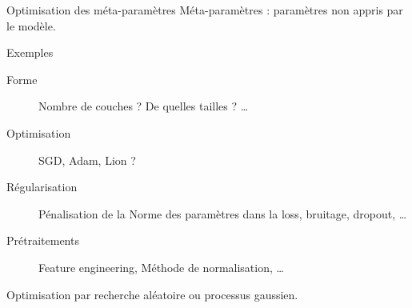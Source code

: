 \begin{frame}{Optimisation des méta-paramètres}
  Méta-paramètres : paramètres \alert{non appris} par le modèle.
  \begin{exampleblock}{Exemples}
    \begin{description}
    \item[Forme] Nombre de couches ? De quelles tailles ? …
    \item [Optimisation] SGD, Adam, Lion ?
    \item [Régularisation] Pénalisation de la Norme des paramètres dans la loss, bruitage, dropout, …
    \item [Prétraitements] Feature engineering, Méthode de normalisation, …
    \end{description}
  \end{exampleblock}
  Optimisation par recherche aléatoire ou processus gaussien.
\end{frame}
